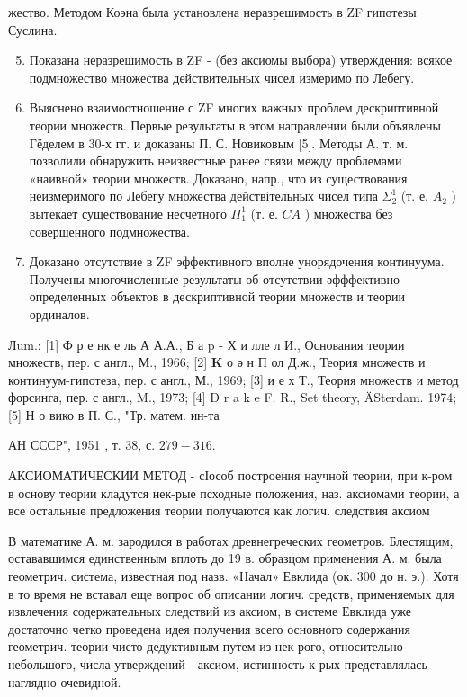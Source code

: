 \documentclass[10pt]{article}
\begin{document}
жество. Методом Коэна была установлена неразрешимость в ZF гипотезы Суслина.



\begin{enumerate}

  \setcounter{enumi}{4}

  \item Показана неразрешимость в ZF - (без аксиомы выбора) утверждения: всякое подмножество множества действительных чисел измеримо по Лебегу.



  \item Выяснено взаимоотношение с ZF многих важных проблем дескриптивной теории множеств. Первые результаты в этом направлении были объявлены Гёделем в 30-х гг. и доказаны П. С. Новиковым [5]. Методы А. т. м. позволили обнаружить неизвестные ранее связи между проблемами «наивной» теории множеств. Доказано, напр., что из существования неизмеримого по Лебегу множества действітельных чисел типа $\Sigma_{2}^{1}$ (т. е. $A_{2}$ ) вытекает существование несчетного $\Pi_{1}^{1}$ (т. е. $C A$ ) множества без совершенного подмножества.



  \item Доказано отсутствие в ZF эффективного вполне унорядочения континуума. Получены многочисленные результаты об отсутствии әфффективно определенных объектов в дескриптивной теории множеств и теории ординалов.



\end{enumerate}



Лum.: [1] Ф р е нк е ль А А.А., Б а p - Х и лле л И., Основания теории множеств, пер. с англ., М., 1966; [2] $\mathbf{K}$ о ә н П ол Д.ж., Теория множеств и континуум-гипотеза, пер. с англ., М., 1969; [3] и е х Т., Теория множеств и метод форсинга, пер. с англ., M., 1973; [4] D r a k e F. R., Set theory, ÄSterdam. 1974; [5] Н о вико в П. С., "Тр. матем. ин-та



АН СССР", 1951 , т. 38, с. $279-316$.



АКСИОМАТИЧЕСКИИ МЕТОД - сІособ построения научной теории, при к-ром в основу теории кладутся нек-рые псходные положения, наз. аксиомами теории, а все остальные предложения теории получаются как логич. следствия аксиом



В математике А. м. зародился в работах древнегреческих геометров. Блестящим, остававшимся единственным вплоть до 19 в. образцом применения А. м. была геометрич. система, известная под назв. «Начал» Евклида (ок. 300 до н. э.). Хотя в то время не вставал еще вопрос об описании логич. средств, применяемых для извлечения содержательных следствий из аксиом, в системе Евклида уже достаточно четко проведена идея получения всего основного содержания геометрич. теории чисто дедуктивным путем из нек-рого, относительно небольшого, числа утверждений - аксиом, истинность к-рых представлялась наглядно очевидной.
\end{document}
